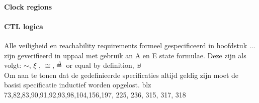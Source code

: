 \paragraph{Clock regions}
\cite{clarke2000Modelchecking}
\cite[p.~14]{clarke2000Modelchecking}
\cite[p.~16--20]{clarke2000Modelchecking}
\cite[p.~22-24]{clarke2000Modelchecking}
\cite[p.27--29]{clarke2000Modelchecking}
\cite[p.~30]{clarke2000Modelchecking}
\cite[p.~32]{clarke2000Modelchecking}
\cite[p.~40--41]{clarke2000Modelchecking}
\cite[p.~46--49]{clarke2000Modelchecking}
\cite[p.~68--71]{clarke2000Modelchecking}
\cite[p.~71]{clarke2000Modelchecking}
\cite[p.~79]{clarke2000Modelchecking}
\cite[p.~121]{clarke2000Modelchecking}
\cite[p.~144--145]{clarke2000Modelchecking}
\cite[p.~178]{clarke2000Modelchecking}
\cite[p.~189]{clarke2000Modelchecking}
\cite[p.~197]{clarke2000Modelchecking}
\cite[p.~199--203]{clarke2000Modelchecking}
\cite[p.~215--236]{clarke2000Modelchecking}
\cite[p.~265--268]{clarke2000Modelchecking}
\cite[p.~268]{clarke2000Modelchecking}
\cite[p.~274--281]{clarke2000Modelchecking}


\cite{audioSemanticsBengtsson}
\cite{guidingAutomataBberm}
\cite{gearTransitionLindahl1}
\cite{gearTransitionLindahl2}
\cite{martinelliScada}
\cite{IgbalReconstructurintTransition1}
\cite{IgbalReconstructurintTransition2}
\cite{huangVerficationStoch}
\cite{bengtssonUppaalVerification}
\cite{pranaliVerificationWaterLevel}
\cite{alexandreUppaalDefinition}
\cite{behzadEvalQOS}
\cite{behzadVariablesQoS}
\cite{alur}
\cite{alurDenseRealTime}
\cite{alurSystemClok}
\cite{alurModelHybrid}
\cite{rijksoverheidSluizen}
\cite{rijksoverheidSluisStroomschema}

\paragraph{CTL logica}
Alle veiligheid en reachability requirements formeel gespecificeerd in hoofdstuk ... zijn geverifieerd in uppaal met gebruik an A en E state formulae. Deze zijn als volgt:
$\sim$, $\xi$ , $\cong$,$\overset{\Delta}{=}$ or equal by definition, $\uplus$
\newline \\
Om aan te tonen dat de gedefinieerde specificaties altijd geldig zijn moet de basisi specificatie inductief worden opgelost. \cite{latin06} blz 73,82,83,90,91,92,93,98,104,156,197, 225, 236, 315, 317, 318\cite[p.~318]{realtimeForms}  

